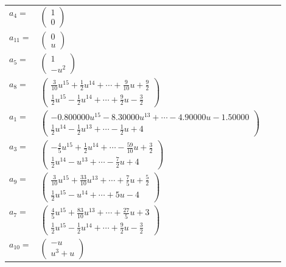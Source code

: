\documentclass[1p]{elsarticle_modified}
\theoremstyle{definition}
\begin{document}
\begin{tabular}{m{7pt} m{180pt} m{7pt} m{180pt} }
\flushright $a_{4}=$&$\begin{pmatrix}1\\0\end{pmatrix}$ \\
\flushright $a_{11}=$&$\begin{pmatrix}0\\u\end{pmatrix}$ \\
\flushright $a_{5}=$&$\begin{pmatrix}1\\- u^2\end{pmatrix}$ \\
\flushright $a_{8}=$&$\begin{pmatrix}\frac{3}{10} u^{15}+\frac{1}{2} u^{14}+\cdots+\frac{9}{10} u+\frac{9}{2}\\\frac{1}{2} u^{15}-\frac{1}{2} u^{14}+\cdots+\frac{9}{2} u-\frac{3}{2}\end{pmatrix}$ \\
\flushright $a_{1}=$&$\begin{pmatrix}-0.800000 u^{15}-8.30000 u^{13}+\cdots-4.90000 u-1.50000\\\frac{1}{2} u^{14}-\frac{1}{2} u^{13}+\cdots-\frac{1}{2} u+4\end{pmatrix}$ \\
\flushright $a_{3}=$&$\begin{pmatrix}-\frac{4}{5} u^{15}+\frac{1}{2} u^{14}+\cdots-\frac{59}{10} u+\frac{3}{2}\\\frac{1}{2} u^{14}- u^{13}+\cdots-\frac{7}{2} u+4\end{pmatrix}$ \\
\flushright $a_{9}=$&$\begin{pmatrix}\frac{3}{10} u^{15}+\frac{33}{10} u^{13}+\cdots+\frac{7}{5} u+\frac{5}{2}\\\frac{1}{2} u^{15}- u^{14}+\cdots+5 u-4\end{pmatrix}$ \\
\flushright $a_{7}=$&$\begin{pmatrix}\frac{4}{5} u^{15}+\frac{83}{10} u^{13}+\cdots+\frac{27}{5} u+3\\\frac{1}{2} u^{15}-\frac{1}{2} u^{14}+\cdots+\frac{9}{2} u-\frac{3}{2}\end{pmatrix}$ \\
\flushright $a_{10}=$&$\begin{pmatrix}- u\\u^3+u\end{pmatrix}$ \\

\end{tabular}
\end{document}
